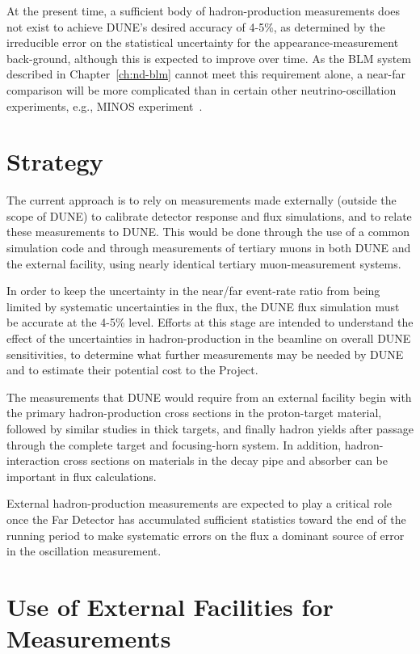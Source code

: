 At the present time, a sufficient body of hadron-production measurements does
not exist to achieve DUNE's desired accuracy of 4-5\%, as determined by the irreducible error on the statistical uncertainty for the appearance-measurement back-ground, although this is expected to improve over time. As the BLM system described in Chapter~\ref{ch:nd-blm} cannot meet this requirement alone, a near-far comparison
will be more complicated than in certain other neutrino-oscillation experiments, e.g.,
MINOS experiment~\cite{gnumi-validation}.


\section{Strategy}
\label{subsec:nu-meas-strat}

The current approach is to rely on measurements made externally (outside the scope
of DUNE) to calibrate detector response and flux simulations, and to relate these
measurements to DUNE. This would be done through the use of a common simulation
code and through measurements of tertiary muons in both DUNE and the external
facility, using nearly identical tertiary muon-measurement systems.

In order to keep the uncertainty in the near/far event-rate ratio from being limited
by systematic uncertainties in the flux, the DUNE flux simulation must be accurate
at the 4-5\% level. Efforts at this stage are intended to understand the effect of the
uncertainties in hadron-production in the beamline on overall DUNE sensitivities,
to determine what further measurements may be needed by DUNE and to estimate
their potential cost to the Project.

The measurements that DUNE would require from an external facility begin with
the primary hadron-production cross sections in the proton-target material, followed
by similar studies in thick targets, and finally hadron yields after passage through
the complete target and focusing-horn system. In addition, hadron-interaction cross
sections on materials in the decay pipe and absorber can be important in flux calculations.


External hadron-production measurements are expected to play
a critical role once the Far Detector has accumulated sufficient
statistics toward the end of the running period to make systematic errors
on the flux a dominant source of error in the oscillation measurement. 

\section{Use of External Facilities for Measurements}

